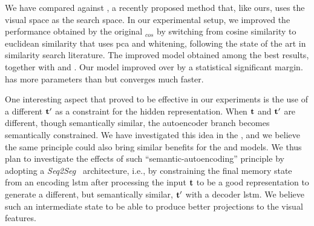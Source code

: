 We have compared against \wordvisual{}, a recently proposed method that, like ours, uses the visual space as the search space.
In our experimental setup, we improved the performance obtained by the original \wordvisual{}$_{cos}$ by switching from cosine similarity to euclidean similarity that uses \gls{pca} and whitening, following the state of the art in similarity search literature.
The improved \wordvisual{} model obtained among the best results, together with \densettv{} and \widedeepttv{}.
Our \widedeepttv{} model improved over \wordvisual{} by a statistical significant margin.
\widedeepttv{} has more parameters than \wordvisual{} but converges much faster.

One interesting aspect that proved to be effective in our experiments is the use of a different $\mathbf{t}'$ as a constraint for the hidden representation.
When $\mathbf{t}$ and $\mathbf{t}'$ are different, though semantically similar, the autoencoder branch becomes semantically constrained.
We have investigated this idea in the \sparsettv{}, and we believe the same principle could also bring similar benefits for the \densettv{} and \widedeepttv{} models.
We thus plan to investigate the effects of such ``semantic-autoencoding'' principle by adopting a  \emph{Seq2Seg}~\cite{cho2014learning} architecture, i.e.,  by constraining the final memory state from an encoding \gls{lstm} after processing the input $\mathbf{t}$ to be a good representation to generate a different, but semantically similar, $\mathbf{t}'$ with a decoder \gls{lstm}.
We believe such an intermediate state to be able to produce better projections to the visual features.

